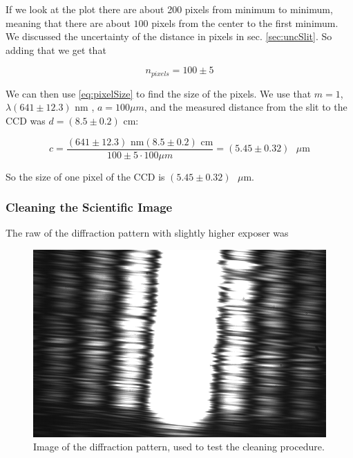 \documentclass{emulateapj}
\begin{document}
If we look at the plot there are about 200 pixels from minimum to minimum, meaning that there are about $100$ pixels from the center to the first minimum. We discussed the uncertainty of the distance in pixels in sec. \ref{sec:uncSlit}. So adding that we get that

\begin{equation}
n_{pixels} = 100\pm 5
\end{equation}

We can then use \eqref{eq:pixelSize} to find the size of the pixels. We use that $m = 1$, $\lambda (641 \pm 12.3)$ nm \cite{laser}, $a = 100 \mu m$, and the measured distance from the slit to the CCD was $d = (8.5 \pm 0.2)$ cm:

\begin{equation}
c =  \frac{(641 \pm 12.3) \text{ nm} (8.5 \pm 0.2) \text{ cm}}{100\pm 5 \cdot100 \mu m} = (5.45 \pm 0.32)\text{ }\mu\text{m}
\end{equation}

So the size of one pixel of the CCD is $(5.45 \pm 0.32)\text{ }\mu\text{m}$.


\subsubsection{Cleaning the Scientific Image}

The raw of the diffraction pattern with slightly higher exposer was

\begin{figure}[H]
\centering
\includegraphics[scale=0.2]{3_2.png}
\caption{Image of the diffraction pattern, used to test the cleaning procedure.}
\label{img:rawClean}
\end{figure}
\end{document}
